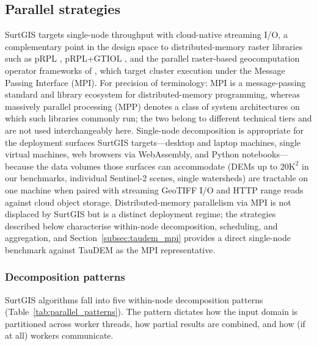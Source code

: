 \documentclass[preprint,review,12pt,authoryear]{elsarticle}
\newif\ifmarkedrev
\newcommand{\revtext}[1]{\ifmarkedrev\textcolor{blue}{#1}\else#1\fi}
\begin{document}
\subsection{Parallel strategies}
\label{subsec:parallel_strategies}

SurtGIS targets single-node throughput with cloud-native streaming I/O, a complementary point in the design space to distributed-memory raster libraries such as pRPL \citep{guan2010prpl}, pRPL+GTIOL \citep{miao2017prplgtiol}, and the parallel raster-based geocomputation operator frameworks of \citet{qin2014strategy}, which target cluster execution under the Message Passing Interface (MPI). \revtext{For precision of terminology: MPI is a message-passing standard and library ecosystem for distributed-memory programming, whereas massively parallel processing (MPP) denotes a class of system architectures on which such libraries commonly run; the two belong to different technical tiers and are not used interchangeably here.} Single-node decomposition is appropriate for the deployment surfaces SurtGIS targets---desktop and laptop machines, single virtual machines, web browsers via WebAssembly, and Python notebooks---because the data volumes those surfaces can accommodate (DEMs up to $20\text{K}^2$ in our benchmarks, individual Sentinel-2 scenes, single watersheds) are tractable on one machine when paired with streaming GeoTIFF I/O and HTTP range reads against cloud object storage. Distributed-memory parallelism via MPI is not displaced by SurtGIS but is a distinct deployment regime; the strategies described below characterise within-node decomposition, scheduling, and aggregation\revtext{, and Section~\ref{subsec:taudem_mpi} provides a direct single-node benchmark against TauDEM as the MPI representative}.

\subsubsection{Decomposition patterns}

SurtGIS algorithms fall into five within-node decomposition patterns (Table~\ref{tab:parallel_patterns}). The pattern dictates how the input domain is partitioned across worker threads, how partial results are combined, and how (if at all) workers communicate.
\end{document}
